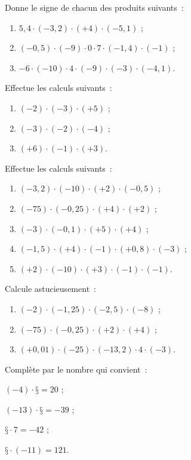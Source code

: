 \begin{exercice}
Donne le signe de chacun des produits suivants :
\begin{enumerate}
 \item $5,4 \cdot (- 3,2) \cdot (+ 4) \cdot (- 5,1)$ ;
 \item $(- 0,5) \cdot (- 9) \cdot 0 \cdot 7 \cdot (- 1,4) \cdot (- 1)$ ;
 \item $- 6 \cdot (- 10) \cdot 4 \cdot (- 9) \cdot (- 3) \cdot (- 4,1)$.
 \end{enumerate}
\end{exercice}


\begin{exercice}
Effectue les calculs suivants :
\begin{enumerate}
 \item $(- 2) \cdot (- 3) \cdot (+ 5)$ ;
 \item $(- 3) \cdot (- 2) \cdot (- 4)$ ;
 \item $(+ 6) \cdot (- 1) \cdot (+ 3)$.
 \end{enumerate}
\end{exercice}


\begin{exercice}
Effectue les calculs suivants :
\begin{enumerate}
 \item $(- 3,2) \cdot (- 10) \cdot (+ 2) \cdot (- 0,5)$ ;
 \item $(- 75) \cdot (- 0,25) \cdot (+ 4) \cdot (+ 2)$ ;
 \item $(- 3) \cdot (- 0,1) \cdot (+ 5) \cdot (+ 4)$ ;
 \item $(- 1,5) \cdot (+ 4) \cdot (- 1) \cdot (+ 0,8) \cdot (- 3)$ ;
 \item $(+ 2) \cdot (- 10) \cdot (+ 3) \cdot (- 1) \cdot (- 1)$.
 \end{enumerate}
\end{exercice}


\begin{exercice}
Calcule astucieusement :
\begin{enumerate}
 \item $(- 2) \cdot (- 1,25) \cdot (- 2,5) \cdot (- 8)$ ;
 \item $(- 75) \cdot (- 0,25) \cdot (+ 2) \cdot (+ 4)$ ;
 \item $(+ 0,01) \cdot (- 25) \cdot (- 13,2) \cdot 4 \cdot (- 3)$.
 \end{enumerate}
\end{exercice}


\begin{exercice}
Complète par le nombre qui convient :
\begin{colenumerate}{2}
 \item $(- 4) \cdot \text{§} = 20$ ;
 \item $(- 13) \cdot \text{§} = - 39$ ;  
 \item $\text{§} \cdot 7 = - 42$ ;
 \item $\text{§} \cdot (- 11) = 121$.
 \end{colenumerate}
\end{exercice}


